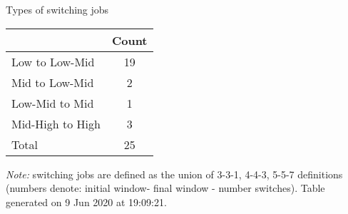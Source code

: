 \begin{center}
\begin{threeparttable}[!h]
\caption{Types of switching jobs}
\begin{tabular}{lc}
\toprule
\toprule
\textbf{}&\multicolumn{1}{c}{\textbf{Count}} \\
\midrule
\midrule
Low to Low-Mid&19 \\
Mid to Low-Mid&2 \\
Low-Mid to Mid&1 \\
Mid-High to High&3 \\
Total&25 \\
\bottomrule
\bottomrule
\end{tabular}
\begin{tablenotes}
\item \footnotesize \textit{Note:} switching jobs are defined as the union of 3-3-1, 4-4-3, 5-5-7 definitions (numbers denote: initial window- final window - number switches). Table generated on  9 Jun 2020 at 19:09:21.
\end{tablenotes}
\end{threeparttable}
\end{center}

